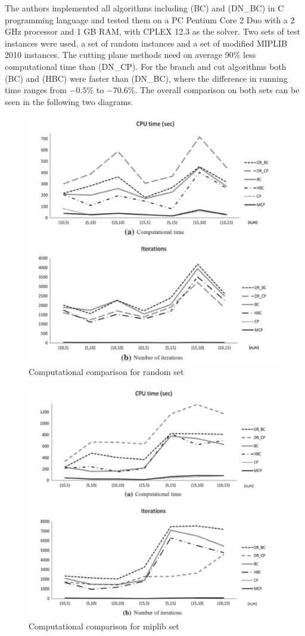 \documentclass{article}
\begin{document}
The authors implemented all algorithms including (BC) and (DN\_BC) in C programming language and tested them on a PC Pentium Core 2 Duo with a 2 GHz processor and 1 GB RAM, with CPLEX 12.3 as the solver. 
Two sets of test instances were used, a set of random instances and a set of modified MIPLIB 2010 instances. 
The cutting plane methods need on average $90\%$ less computational time than (DN\_CP). For the branch and cut algorithms both (BC) and (HBC) were faster than (DN\_BC), where the difference in running time ranges from $-0.5\%$ to $-70.6\%$. The overall comparison on both sets can be seen in the following two diagrams.
\begin{figure}
	\centering
	\includegraphics[width = 0.4\textheight]{run-times_2.pdf}
	\caption{Computational comparison for random set}
\end{figure}
\begin{figure}
	\centering
	\includegraphics[height = 0.4\textheight]{run-times.pdf}
	\caption{Computational comparison for miplib set}
\end{figure}
	\newpage
	
	
\end{document}
